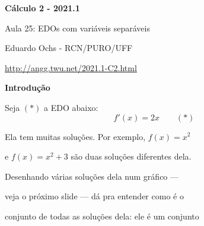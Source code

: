 \documentclass[oneside,12pt]{article}
\begin{document}
\def\EDOVSGtwo{
  \left(
  \begin{array}{rcl}
  \D \frac{dy}{dx} &=& \D \frac{f(x)}{g(y)} \\ [10pt]
                 y &=& G^{-1}(F(x) + C_3)   \\
  \end{array}
  \right)
  }

\def\drafturl{http://angg.twu.net/LATEX/2021-1-C2.pdf}
\def\drafturl{http://angg.twu.net/2021.1-C2.html}
\def\draftfooter{\tiny \href{\drafturl}{\jobname{}} \ColorBrown{\shorttoday{} \hours}}



%

\thispagestyle{empty}

\begin{center}

\vspace*{1.2cm}

{\bf \Large Cálculo 2 - 2021.1}

\bsk

Aula 25: EDOs com variáveis separáveis

\bsk

Eduardo Ochs - RCN/PURO/UFF

\url{http://angg.twu.net/2021.1-C2.html}

\end{center}

\newpage



{\bf Introdução}

Seja $(*)$ a EDO abaixo:
%
$$f'(x) = 2x \qquad (*)$$

Ela tem muitas soluções. Por exemplo, $f(x) = x^2$

e $f(x) = x^2+3$ são duas soluções diferentes dela.

\msk

Desenhando várias soluções dela num gráfico ---

veja o próximo slide --- dá pra entender como é o

conjunto de todas as soluções dela: ele é um conjunto
\end{document}
